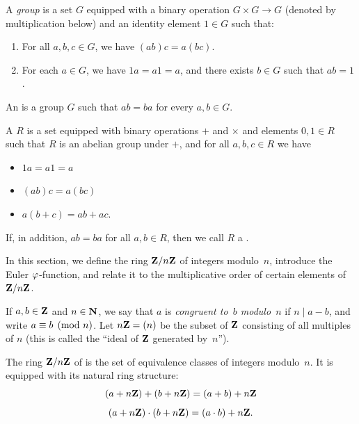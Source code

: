\begin{definition}[Group]\label{defn:group}
A {\em group} is a set $G$ equipped with a binary operation
$G \times G \to G$ (denoted by multiplication below)
and an identity element $1\in G$ such that:
\begin{enumerate}
\item For all $a,b,c\in G$, we have $(ab)c = a(bc)$.
\item For each $a\in G$, we have $1a=a1=a$, and there exists $b\in G$ such that
$ab = 1$.
\end{enumerate}
\end{definition}

\begin{definition}\label{defn:abelian}
An  is a group $G$
such that $ab=ba$ for every $a,b\in G$.
\end{definition}


\begin{definition}[Ring]\label{defn:ring}
A  $R$ is a set equipped with binary operations
$+$ and $\times$ and elements $0,1\in R$ such that
$R$ is an abelian group under $+$,
and for all $a,b,c \in R$ we have
\begin{itemize}
\item $1a = a1 = a$
\item $(ab)c = a(bc)$
\item $a(b+c) = ab + ac$.
\end{itemize}
If, in addition, $ab=ba$ for all $a,b\in R$, then we
call $R$ a .
\end{definition}

In this section, we define the ring $\mathbf{Z}/n\mathbf{Z}{}$ of integers modulo~$n$,
introduce the Euler $\varphi$-function,
 and relate it to the multiplicative
order of certain elements of $\mathbf{Z}/n\mathbf{Z}{}$.

If $a,b\in\mathbf{Z}$ and $n\in\mathbf{N}$, we say that $a$ is {\em congruent to~$b$
  modulo~$n$} if $n\mid a-b$, and write $a\equiv b\pmod{n}$.  Let
$n\mathbf{Z}=(n)$ be the subset of $\mathbf{Z}$ consisting of all multiples of $n$
(this is called the ``ideal of $\mathbf{Z}$ generated by~$n$'').
\begin{definition}
  The ring $\mathbf{Z}/n\mathbf{Z}{}$ of  is the set of
  equivalence classes of integers modulo~$n$.  It is equipped with its
  natural ring structure:
$$
  (a + n\mathbf{Z}) + (b + n\mathbf{Z}) = (a+b) + n\mathbf{Z}
$$
$$
  (a + n\mathbf{Z}) \cdot (b + n\mathbf{Z}) = (a\cdot b) + n\mathbf{Z}.
$$
\end{definition}


